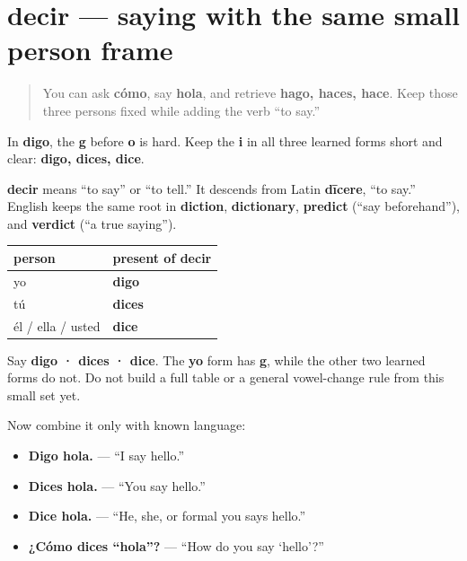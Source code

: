 \section[decir]{decir — saying with the same small person frame}

\label{lesson:ES-C12-decir}



\begin{quote}
You can ask \textbf{cómo}, say \textbf{hola}, and retrieve \textbf{hago, haces, hace}. Keep those three persons fixed while adding the verb “to say.”
\end{quote}

\begin{sounds}
In \textbf{digo}, the \textbf{g} before \textbf{o} is hard. Keep the \textbf{i} in all three learned forms short and clear: \textbf{digo, dices, dice}.
\end{sounds}

\begin{cousinweb}
\textbf{decir} means “to say” or “to tell.” It descends from Latin \textbf{dīcere}, “to say.” English keeps the same root in \textbf{diction}, \textbf{dictionary}, \textbf{predict} (“say beforehand”), and \textbf{verdict} (“a true saying”).
\end{cousinweb}

\begin{grammarlens}[title={Grammar Lens: one more three-form set}]
\noindent
\begin{tabularx}{\linewidth}{@{}>{\raggedright\arraybackslash}X>{\raggedright\arraybackslash}X@{}}
\toprule
\textbf{person} & \textbf{present of \textbf{decir}} \\
\midrule
yo & \textbf{digo} \\
tú & \textbf{dices} \\
él / ella / usted & \textbf{dice} \\
\bottomrule
\end{tabularx}

Say \textbf{digo · dices · dice}. The \textbf{yo} form has \textbf{g}, while the other two learned forms do not. Do not build a full table or a general vowel-change rule from this small set yet.

Now combine it only with known language:

\begin{itemize}
\raggedright
  \item \textbf{Digo hola.} — “I say hello.”
  \item \textbf{Dices hola.} — “You say hello.”
  \item \textbf{Dice hola.} — “He, she, or formal you says hello.”
  \item \textbf{¿Cómo dices “hola”?} — “How do you say ‘hello’?”
\end{itemize}
\end{grammarlens}

